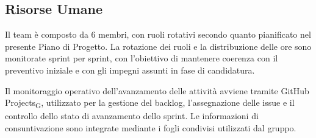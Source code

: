 \subsection{Risorse Umane}

Il team è composto da 6 membri, con ruoli rotativi secondo quanto pianificato
nel presente Piano di Progetto. La rotazione dei ruoli e la distribuzione delle
ore sono monitorate sprint per sprint, con l'obiettivo di mantenere coerenza con
il preventivo iniziale e con gli impegni assunti in fase di candidatura.

Il monitoraggio operativo dell'avanzamento delle attività avviene tramite
GitHub Projects\textsubscript{G}, utilizzato per la gestione del backlog,
l'assegnazione delle issue e il controllo dello stato di avanzamento dello
sprint. Le informazioni di consuntivazione sono integrate mediante i fogli
condivisi utilizzati dal gruppo.
